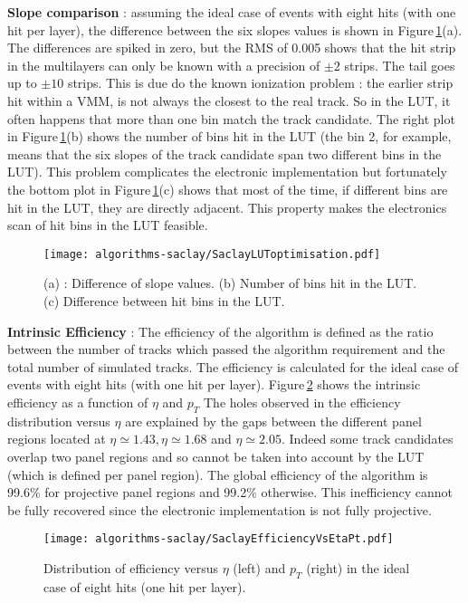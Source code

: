  \textbf{Slope comparison} : assuming the ideal case of events with eight hits (with one hit per layer), the difference between the six slopes values is shown in Figure\,\ref{fig:SaclayLUToptimisation}(a). The differences are spiked in zero, but the RMS of 0.005 shows that the hit strip in the multilayers can only be known with a precision of $\pm 2$ strips. The tail goes up to $\pm 10$  strips.
This is due do the known ionization problem : the earlier strip hit within a VMM, is not always the closest to the real track. So in the LUT, it often happens that more than one bin match the track candidate. The right plot in Figure\,\ref{fig:SaclayLUToptimisation}(b) shows the number of bins hit in
the LUT (the bin 2, for example, means that the six slopes of the track candidate span two different bins in the LUT). This problem
complicates the electronic implementation but fortunately the bottom plot in Figure\,\ref{fig:SaclayLUToptimisation}(c) shows that most of the time, if different bins are hit in the LUT, they are directly adjacent. This property makes the electronics scan of hit bins in the LUT feasible.
 \begin{figure}[htb!]
  \begin{center}
  \texttt{[image: algorithms-saclay/SaclayLUToptimisation.pdf]}
  \caption{(a) : Difference of slope values. (b) Number of bins hit in the LUT. (c) Difference between hit bins in the LUT. }
  \label{fig:SaclayLUToptimisation}
  \end{center}
  \end{figure}

 \textbf{Intrinsic Efficiency} : The efficiency of the algorithm is defined as the ratio between the number of tracks which passed the algorithm requirement
and the total number of simulated tracks. The efficiency is calculated for the ideal case of events with eight hits (with one hit per layer).
 Figure\,\ref{fig:SaclayEfficiencyVsEtaPt}  shows the intrinsic efficiency as a function of $\eta$ and $p_{T}$
The holes observed in the efficiency distribution versus $\eta$ are explained by the gaps between the different panel regions located at $\eta \simeq 1.43, \eta \simeq 1.68$ and $\eta \simeq 2.05$. Indeed some track candidates overlap two panel regions and so cannot be taken into account by the LUT (which is defined per panel region). The global efficiency of the algorithm is 99.6\% for projective panel regions and 99.2\% otherwise. This inefficiency  cannot be fully recovered since the electronic implementation is not fully projective.
  \begin{figure}[htb!]
  \centering
  \texttt{[image: algorithms-saclay/SaclayEfficiencyVsEtaPt.pdf]}
  \caption{Distribution of efficiency versus $\eta$ (left) and $p_{T}$ (right) in the ideal case of eight hits (one hit per layer).}
  \label{fig:SaclayEfficiencyVsEtaPt}
  \end{figure}

